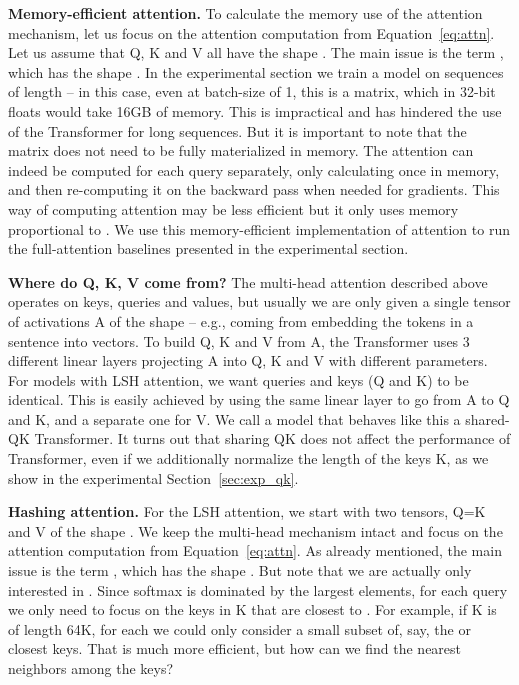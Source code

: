 \documentclass{article} \usepackage{iclr2020_conference,times}
\renewcommand{\paragraph}[1]{\textbf{#1}}
\begin{document}
\paragraph{Memory-efficient attention.}
To calculate the memory use of the attention mechanism, let us focus on
the attention computation from Equation~\ref{eq:attn}.
Let us assume that Q, K and V all have the shape
. The main issue is
the term , which has the shape .
In the experimental section we train a model on sequences of length
 -- in this case, even at batch-size of 1, this is a 
matrix, which in 32-bit floats would take 16GB of memory.
This is impractical and has hindered the use of the Transformer for long
sequences. But it is important to note that the  matrix does not
need to be fully materialized in memory. The attention can indeed be computed
for each query  separately, only calculating  
once in memory, and then re-computing it on the backward pass when needed for gradients.
This way of computing attention may be less efficient but it only uses
memory proportional to . We use this memory-efficient implementation
of attention to run the full-attention baselines presented in the experimental
section.

\paragraph{Where do Q, K, V come from?}
The multi-head attention described above operates on keys, queries and
values, but usually we are only given a single tensor of activations A
of the shape  -- e.g., coming from
embedding the tokens in a sentence into vectors. To build Q, K and V
from A, the Transformer uses 3 different linear layers projecting A
into Q, K and V with different parameters. For models with LSH attention,
we want queries and keys (Q and K) to be identical. This is easily achieved
by using the same linear layer to go from A to Q and K, and a separate one
for V. We call a model that behaves like this a shared-QK Transformer.
It turns out that sharing QK does not affect the performance of Transformer,
even if we additionally normalize the length of the keys K,
as we show in the experimental Section~\ref{sec:exp_qk}.

\paragraph{Hashing attention.}
For the LSH attention, we start with two tensors, Q=K and V
of the shape .
We keep the multi-head mechanism intact and focus on the attention
computation from Equation~\ref{eq:attn}. As already mentioned,
the main issue is the term , which has the shape
. But note that we are actually only
interested in . Since softmax is dominated
by the largest elements, for each query  we only need to focus
on the keys in K that are closest to . For example, if K is of
length 64K, for each  we could only consider a small subset of,
say, the  or  closest keys. That is much more efficient, but how
can we find the nearest neighbors among the keys?
\end{document}

